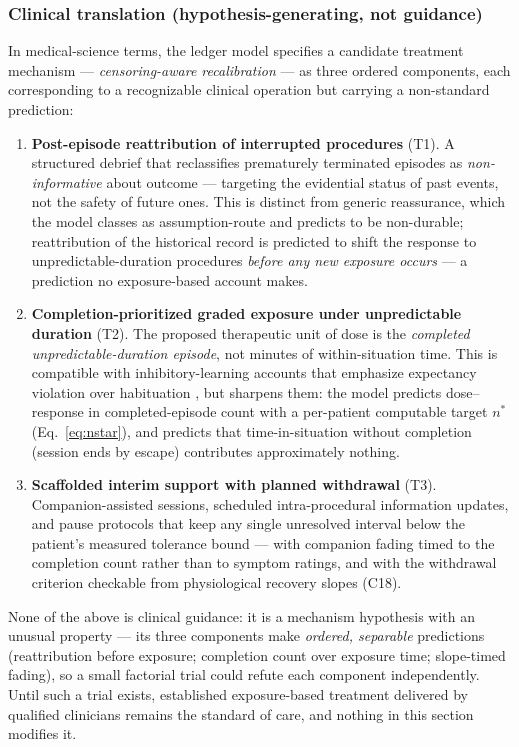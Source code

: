 \documentclass[9pt,twocolumn]{article}
\begin{document}
\subsubsection{Clinical translation (hypothesis-generating, not guidance)}
In medical-science terms, the ledger model specifies a candidate treatment mechanism --- \emph{censoring-aware recalibration} --- as three ordered components, each corresponding to a recognizable clinical operation but carrying a non-standard prediction:
\begin{enumerate}[leftmargin=1.7em]
\item \textbf{Post-episode reattribution of interrupted procedures} (T1). A structured debrief that reclassifies prematurely terminated episodes as \emph{non-informative} about outcome --- targeting the evidential status of past events, not the safety of future ones. This is distinct from generic reassurance, which the model classes as assumption-route and predicts to be non-durable; reattribution of the historical record is predicted to shift the response to unpredictable-duration procedures \emph{before any new exposure occurs} --- a prediction no exposure-based account makes.
\item \textbf{Completion-prioritized graded exposure under unpredictable duration} (T2). The proposed therapeutic unit of dose is the \emph{completed unpredictable-duration episode}, not minutes of within-situation time. This is compatible with inhibitory-learning accounts that emphasize expectancy violation over habituation \cite{craske2014}, but sharpens them: the model predicts dose--response in completed-episode count with a per-patient computable target $n^{*}$ (Eq.~\ref{eq:nstar}), and predicts that time-in-situation without completion (session ends by escape) contributes approximately nothing.
\item \textbf{Scaffolded interim support with planned withdrawal} (T3). Companion-assisted sessions, scheduled intra-procedural information updates, and pause protocols that keep any single unresolved interval below the patient's measured tolerance bound --- with companion fading timed to the completion count rather than to symptom ratings, and with the withdrawal criterion checkable from physiological recovery slopes (C18).
\end{enumerate}
None of the above is clinical guidance: it is a mechanism hypothesis with an unusual property --- its three components make \emph{ordered, separable} predictions (reattribution before exposure; completion count over exposure time; slope-timed fading), so a small factorial trial could refute each component independently. Until such a trial exists, established exposure-based treatment delivered by qualified clinicians remains the standard of care, and nothing in this section modifies it.
\end{document}
